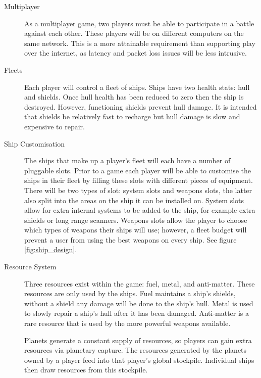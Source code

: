 \begin{description}

	\item[Multiplayer]

	As a multiplayer game, two players must be able to participate in a battle against each other.
	These players will be on different computers on the same network. This is a more attainable requirement than supporting play over the internet, as latency and packet loss issues will be less intrusive.

	\item[Fleets]

	Each player will control a fleet of ships. Ships have two health stats: hull and shields. Once hull health has been reduced to zero then the ship is destroyed. However, functioning shields prevent hull damage. It is intended that shields be relatively fast to recharge but hull damage is slow and expensive to repair.

	\item[Ship Customisation]

	The ships that make up a player's fleet will each have a number of pluggable slots. Prior to a game each player will be able to customise the ships in their fleet by filling these slots with different pieces of equipment. There will be two types of slot: system slots and weapons slots, the latter also split into the areas on the ship it can be installed on. System slots allow for extra internal systems to be added to the ship, for example extra shields or long range scanners. Weapons slots allow the player to choose which types of weapons their ships will use; however, a fleet budget will prevent a user from using the best weapons on every ship. See figure \ref{fig:ship_design}.

	\item[Resource System]

	Three resources exist within the game: fuel, metal, and anti-matter. These resources are only used by the ships. Fuel maintains a ship's shields, without a shield any damage will be done to the ship's hull. Metal is used to slowly repair a ship's hull after it has been damaged. Anti-matter is a rare resource that is used by the more powerful weapons available.

	Planets generate a constant supply of resources, so players can gain extra resources via planetary capture. The resources generated by the planets owned by a player feed into that player's global stockpile. Individual ships then draw resources from this stockpile.


\end{description}
